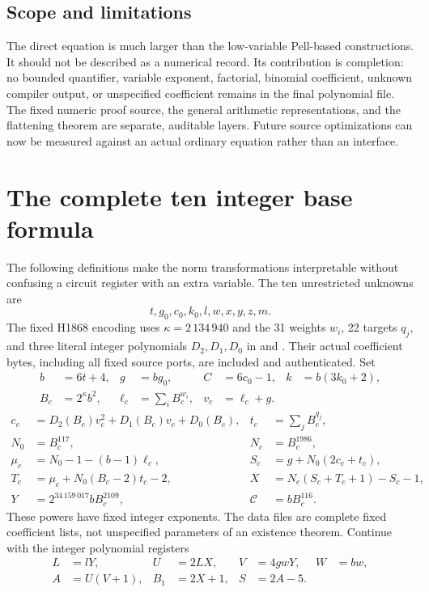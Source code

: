 \documentclass[11pt]{article}
\begin{document}
\subsection{Scope and limitations}

The direct equation is much larger than the low-variable Pell-based
constructions. It should not be described as a numerical record.
Its contribution is completion: no bounded quantifier, variable exponent,
factorial, binomial coefficient, unknown compiler output, or unspecified
coefficient remains in the final polynomial file. The fixed numeric proof
source, the general arithmetic representations, and the flattening theorem
are separate, auditable layers. Future source optimizations can now be
measured against an actual ordinary equation rather than an interface.


\section{The complete ten integer base formula}
The following definitions make the norm transformations interpretable without
confusing a circuit register with an extra variable. The ten unrestricted
unknowns are
\[
 t,g_0,c_0,k_0,l,w,x,y,z,m.
\]
The fixed H1868 encoding uses $\kappa=2\,134\,940$ and the 31 weights
$w_i$, 22 targets $q_j$, and three literal integer polynomials
$D_2,D_1,D_0$ in  and
. Their actual coefficient bytes, including
all fixed source ports, are included and authenticated. Set
\begin{align*}
 b&=6t+4,&g&=bg_0,&C&=6c_0-1,&k&=b(3k_0+2),\\
 B_c&=2^\kappa b^2,&\ell_c&=\sum_iB_c^{w_i},&v_c&=\ell_c+g.
\end{align*}
\begin{align*}
 c_c&=D_2(B_c)v_c^2+D_1(B_c)v_c+D_0(B_c),&t_c&=\sum_jB_c^{q_j},\\
 N_0&=B_c^{117},&N_c&=B_c^{1986},\\
 \mu_c&=N_0-1-(b-1)\ell_c,&S_c&=g+N_0(2c_c+t_c),\\
 T_c&=\mu_c+N_0(B_c-2)t_c-2,&X&=N_c(S_c+T_c+1)-S_c-1,\\
 Y&=2^{34\,159\,017}bB_c^{2109},&\mathcal C&=bB_c^{116}.
\end{align*}
These powers have fixed integer exponents. The data files are complete fixed
coefficient lists, not unspecified parameters of an existence theorem.
Continue with the integer polynomial registers
\begin{align*}
 L&=lY,&U&=2LX,&V&=4gwY,&W&=bw,\\
 A&=U(V+1),&B_1&=2X+1,&S&=2A-5.
\end{align*}
\end{document}

